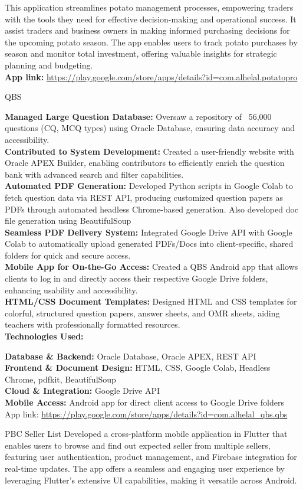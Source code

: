 \documentclass[a4paper,12pt]{article}
\begin{document}
\begin{CV}
This application streamlines potato management processes, empowering traders with the tools they need for effective decision-making and operational success. It assist traders and business owners in making informed purchasing decisions for the upcoming potato season. The app enables users to track potato purchases by season and monitor total investment, offering valuable insights for strategic planning and budgeting.\\
\textbf{App link:} \href{https://play.google.com/store/apps/details?id=com.alhelal.potatopro}{https://play.google.com/store/apps/details?id=com.alhelal.potatopro}
\item[QBS]

\textbf{Managed Large Question Database:} Oversaw a repository of ~56,000 questions (CQ, MCQ types) using Oracle Database, ensuring data accuracy and accessibility.\\
\textbf{Contributed to System Development:} Created a user-friendly website with Oracle APEX Builder, enabling contributors to efficiently enrich the question bank with advanced search and filter capabilities.\\
\textbf{Automated PDF Generation:} Developed Python scripts in Google Colab to fetch question data via REST API, producing customized question papers as PDFs through automated headless Chrome-based generation. Also developed doc file generation using BeautifulSoup\\
\textbf{Seamless PDF Delivery System:} Integrated Google Drive API with Google Colab to automatically upload generated PDFs/Docs into client-specific, shared folders for quick and secure access.\\
\textbf{Mobile App for On-the-Go Access:} Created a QBS Android app that allows clients to log in and directly access their respective Google Drive folders, enhancing usability and accessibility.\\
\textbf{HTML/CSS Document Templates:} Designed HTML and CSS templates for colorful, structured question papers, answer sheets, and OMR sheets, aiding teachers with professionally formatted resources.\\
\textbf{Technologies Used:}

\textbf{Database \& Backend:} Oracle Database, Oracle APEX, REST API\\
\textbf{Frontend \& Document Design:} HTML, CSS, Google Colab, Headless Chrome, pdfkit, BeautifulSoup\\
\textbf{Cloud \& Integration:} Google Drive API\\
\textbf{Mobile Access:} Android app for direct client access to Google Drive folders\\
App link: \href{https://play.google.com/store/apps/details?id=com.alhelal\_qbs.qbs}{https://play.google.com/store/apps/details?id=com.alhelal\_qbs.qbs}
\item[PBC Seller List]
Developed a cross-platform mobile application in Flutter that enables users to browse and find out expected seller from multiple sellers, featuring user authentication, product management, and Firebase integration for real-time updates. The app offers a seamless and engaging user experience by leveraging Flutter's extensive UI capabilities, making it versatile across Android.


\end{CV}
\end{document}
